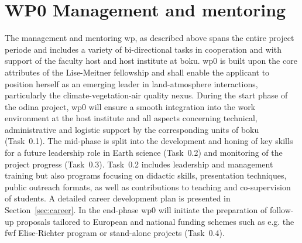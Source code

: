 \section{WP0 Management and mentoring}
\label{sec:wp0}
The management and mentoring \gls{wp}, as described above spans the entire project periode and includes a variety of bi-directional tasks in cooperation and with support of the faculty host and host institute at \gls{boku}. \gls{wp}0 is built upon the  core attributes of the Lise-Meitner fellowship  and shall enable the applicant to position herself as an emerging leader in land-atmosphere interactions, particularly the climate-vegetation-air quality nexus. During the start phase of the \gls{odina} project, \gls{wp}0 will ensure a smooth integration into the work environment at the host institute  and all aspects concerning technical, administrative and logistic support by the corresponding units of \gls{boku} (Task~0.1). The mid-phase is split into the development and honing of key skills for a future leadership role in Earth science (Task~0.2) and monitoring of the project progress (Task~0.3). Task~0.2 includes leadership and management training but also programs focusing on didactic skills, presentation techniques, public outreach formats, as well as contributions to  teaching and co-supervision of students. A detailed career development plan is presented in Section~\ref{sec:career}. In the end-phase \gls{wp}0 will initiate the preparation of follow-up proposals tailored to European and national funding schemes such as e.g. the \gls{fwf} Elise-Richter program or stand-alone projects (Task~0.4).

